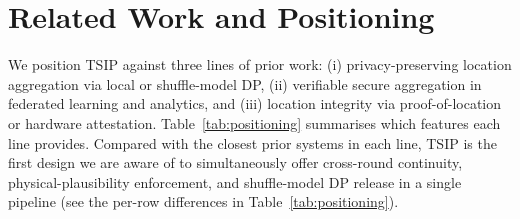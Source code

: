 \documentclass[conference]{IEEEtran}
\theoremstyle{definition}
\theoremstyle{plain}
\begin{document}
\section{Related Work and Positioning} \label{sec:related-work}

We position \textsc{TSIP} against three lines of prior work:
(i) privacy-preserving location aggregation via local or shuffle-model DP,
(ii) verifiable secure aggregation in federated learning and analytics, and
(iii) location integrity via proof-of-location or hardware attestation.
Table~\ref{tab:positioning} summarises which features each line provides.
Compared with the closest prior systems in each line,
\textsc{TSIP} is the first design we are aware of to simultaneously offer
cross-round continuity, physical-plausibility enforcement, and shuffle-model
DP release in a single pipeline (see the per-row differences in
Table~\ref{tab:positioning}).
\end{document}
